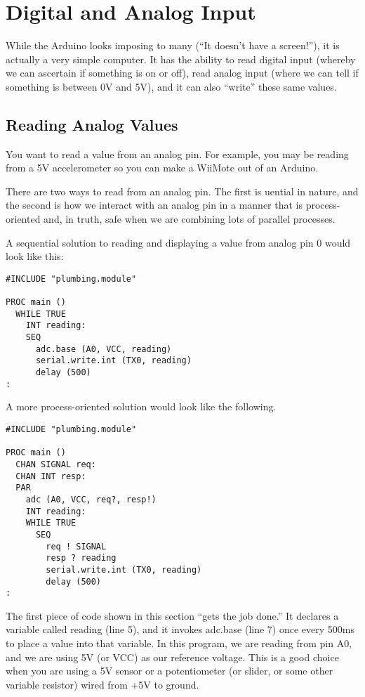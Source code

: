 \chapter{Digital and Analog Input}
While the Arduino looks imposing to many (``It doesn't have a screen!''), it is actually a very simple computer. It has the ability to read digital input (whereby we can ascertain if something is on or off), read analog input (where we can tell if something is between 0V and 5V), and it can also ``write'' these same values.

% 
\section{Reading Analog Values}
\problem
You want to read a value from an analog pin. For example, you may be reading from a 5V accelerometer so you can make a WiiMote out of an Arduino.

\solution
There are two ways to read from an analog pin. The first is {\SEQ}uential in nature, and the second is how we interact with an analog pin in a manner that is process-oriented and, in truth, safe when we are combining lots of parallel processes.

A sequential solution to reading and displaying a value from analog pin 0 would look like this:

\begin{lstlisting}
#INCLUDE "plumbing.module"

PROC main ()
  WHILE TRUE
    INT reading:
    SEQ
      adc.base (A0, VCC, reading)
      serial.write.int (TX0, reading)
      delay (500)
:
\end{lstlisting}

A more process-oriented solution would look like the following.

\begin{lstlisting}
#INCLUDE "plumbing.module"

PROC main ()
  CHAN SIGNAL req:
  CHAN INT resp:
  PAR
    adc (A0, VCC, req?, resp!)
    INT reading:
    WHILE TRUE
      SEQ
        req ! SIGNAL
        resp ? reading
        serial.write.int (TX0, reading)
        delay (500)
:
\end{lstlisting}

\discussion
The first piece of code shown in this section ``gets the job done.'' It declares a variable called {\code reading} (line 5), and it invokes {\code adc.base} (line 7) once every 500ms to place a value into that variable. In this program, we are reading from pin {\constant A0}, and we are using 5V (or {\constant VCC}) as our reference voltage. This is a good choice when you are using a 5V sensor or a potentiometer (or slider, or some other variable resistor) wired from +5V to ground.

